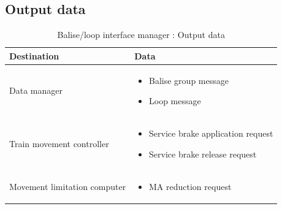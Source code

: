 \documentclass[nocc]{template/openetcs_report}
\begin{document}
\subsection{Output data}
			\begin{longtable}{|l|l|}
				\caption{Balise/loop interface manager : Output data}\\ 
				\hline
				
					\begin{minipage}[t]{0.35\linewidth} \textbf{Destination}	\end{minipage} 
				&	\begin{minipage}[t]{0.65\linewidth} \textbf{Data} \end{minipage} \\
				
				\hline
																																									
					\begin{minipage}[t]{0.35\linewidth} Data manager	\end{minipage} 
				&	\begin{minipage}[t]{0.65\linewidth}
						\begin{itemize}
							\item Balise group message
							\item Loop message						
						\end{itemize}
					\end{minipage} \\
				
				\hline
				
					\begin{minipage}[t]{0.35\linewidth} Train movement controller	\end{minipage} 
				&	\begin{minipage}[t]{0.65\linewidth}
						\begin{itemize}
							\item Service brake application request
							\item Service brake release request
						\end{itemize}			
					\end{minipage} \\
				
				\hline
					
					\begin{minipage}[t]{0.35\linewidth} Movement limitation computer	\end{minipage} 
				&	\begin{minipage}[t]{0.65\linewidth}
						\begin{itemize}
							\item MA reduction request
						\end{itemize}			
					\end{minipage} \\
				

\end{longtable}
\end{document}
